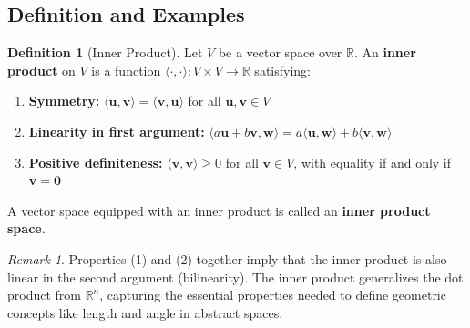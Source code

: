 \documentclass[12pt]{article}
\numberwithin{equation}{section}
\newcommand{\vect}[1]{\boldsymbol{#1}}   %
\theoremstyle{plain}
\theoremstyle{definition}
\newtheorem{definition}[theorem]{Definition}
\theoremstyle{remark}
\newtheorem{remark}[theorem]{Remark}
\begin{document}
\subsection{Definition and Examples}

\begin{definition}[Inner Product]
Let $V$ be a vector space over $\mathbb{R}$. An \textbf{inner product} on $V$ is a function $\langle \cdot, \cdot \rangle: V \times V \to \mathbb{R}$ satisfying:

\begin{enumerate}
\item \textbf{Symmetry:} $\langle \vect{u}, \vect{v} \rangle = \langle \vect{v}, \vect{u} \rangle$ for all $\vect{u}, \vect{v} \in V$
\item \textbf{Linearity in first argument:} $\langle a\vect{u} + b\vect{v}, \vect{w} \rangle = a\langle \vect{u}, \vect{w} \rangle + b\langle \vect{v}, \vect{w} \rangle$
\item \textbf{Positive definiteness:} $\langle \vect{v}, \vect{v} \rangle \geq 0$ for all $\vect{v} \in V$, with equality if and only if $\vect{v} = \vect{0}$
\end{enumerate}

A vector space equipped with an inner product is called an \textbf{inner product space}.
\end{definition}

\begin{remark}
Properties (1) and (2) together imply that the inner product is also linear in the second argument (bilinearity). The inner product generalizes the dot product from $\mathbb{R}^n$, capturing the essential properties needed to define geometric concepts like length and angle in abstract spaces.
\end{remark}
\end{document}
